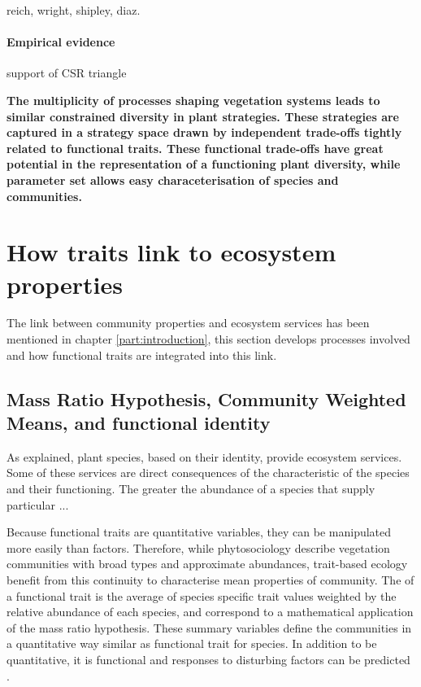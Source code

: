 reich, wright, shipley, diaz.

\paragraph{Empirical evidence}

support of CSR triangle \cite{frenette-dussault_functional_2012, pierce_allocating_2013}

\textbf{The multiplicity of processes shaping vegetation systems leads to similar constrained diversity in plant strategies. These strategies are captured in a strategy space drawn by independent trade-offs tightly related to functional traits. These functional trade-offs have great potential in the representation of a functioning plant diversity, while parameter set allows easy characeterisation of species and communities.}



\section{How traits link to ecosystem properties}

The link between community properties and ecosystem services has been mentioned in chapter \ref{part:introduction}, this section develops processes involved and how functional traits are integrated into this link.

\subsection{Mass Ratio Hypothesis, Community Weighted Means, and functional identity}

As explained, plant species, based on their identity, provide ecosystem services. Some of these services are direct consequences of the characteristic of the species and their functioning. The greater the abundance of a species that supply particular ...

Because functional traits are quantitative variables, they can be manipulated more easily than factors. Therefore, while phytosociology describe vegetation communities with broad types and approximate abundances, trait-based ecology benefit from this continuity to characterise mean properties of community. The  of a functional trait is the average of species specific trait values weighted by the relative abundance of each species, and correspond to a mathematical application of the mass ratio hypothesis. These summary variables define the communities in a quantitative way similar as functional trait for species. In addition to be quantitative, it is functional and responses to disturbing factors can be predicted \parencite{lavorel_predicting_2002}.


